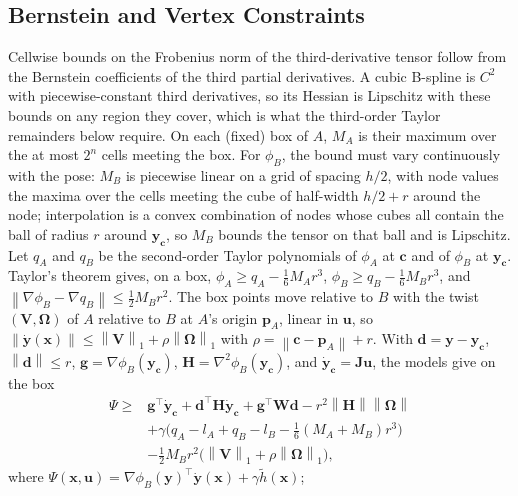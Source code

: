 \documentclass[journal]{IEEEtran}
\theoremstyle{definition}
\newcommand{\norm}[1]{\left\lVert #1\right\rVert}
\begin{document}
\subsection{Bernstein and Vertex Constraints}
Cellwise bounds on the Frobenius norm of the third-derivative tensor follow from the Bernstein
coefficients of the third partial derivatives. A cubic B-spline is $C^2$ with piecewise-constant third
derivatives, so its Hessian is Lipschitz with these bounds on any region they cover, which is what the
third-order Taylor remainders below require. On each (fixed) box of $A$, $M_A$ is their maximum over
the at most $2^n$ cells meeting the box. For $\phi_B$, the bound must vary continuously with the pose:
$M_B$ is piecewise linear on a grid of spacing $h/2$, with node values the maxima over the cells meeting
the cube of half-width $h/2+r$ around the node; interpolation is a convex combination of nodes whose
cubes all contain the ball of radius $r$ around $\mathbf y_{\mathbf c}$, so $M_B$ bounds the tensor on
that ball and is Lipschitz. Let $q_A$ and $q_B$ be the second-order Taylor polynomials of
$\phi_A$ at $\mathbf c$ and of $\phi_B$ at $\mathbf y_{\mathbf c}$. Taylor's theorem gives, on a box,
$\phi_A\ge q_A-\tfrac16M_Ar^3$, $\phi_B\ge q_B-\tfrac16M_Br^3$, and
$\norm{\nabla\phi_B-\nabla q_B}\le\tfrac12M_Br^2$. The box points move relative to $B$ with the twist
$(\mathbf V,\boldsymbol\Omega)$ of $A$ relative to $B$ at $A$'s origin $\mathbf p_A$, linear in $\mathbf u$,
so $\norm{\dot{\mathbf y}(\mathbf x)}\le\norm{\mathbf V}_1+\rho\norm{\boldsymbol\Omega}_1$ with
$\rho=\norm{\mathbf c-\mathbf p_A}+r$. With $\mathbf d=\mathbf y-\mathbf y_{\mathbf c}$, $\norm{\mathbf d}\le r$,
$\mathbf g=\nabla\phi_B(\mathbf y_{\mathbf c})$, $\mathbf H=\nabla^2\phi_B(\mathbf y_{\mathbf c})$, and
$\dot{\mathbf y}_{\mathbf c}=\mathbf J\mathbf u$, the models give on the box
\begin{equation}\label{eq:psi-lb}
\begin{aligned}
\Psi\ge{}&\mathbf g^\top\dot{\mathbf y}_{\mathbf c}+\mathbf d^\top\mathbf H\dot{\mathbf y}_{\mathbf c}
+\mathbf g^\top\mathbf W\mathbf d-r^2\norm{\mathbf H}\norm{\boldsymbol\Omega}\\
&+\gamma\big(q_A-l_A+q_B-l_B-\tfrac16(M_A+M_B)r^3\big)\\
&-\tfrac12M_Br^2\big(\norm{\mathbf V}_1+\rho\norm{\boldsymbol\Omega}_1\big),
\end{aligned}
\end{equation}
where $\Psi(\mathbf x,\mathbf u)=\nabla\phi_B(\mathbf y)^\top\dot{\mathbf y}(\mathbf x)+\gamma\tilde h(\mathbf x)$;
\end{document}
